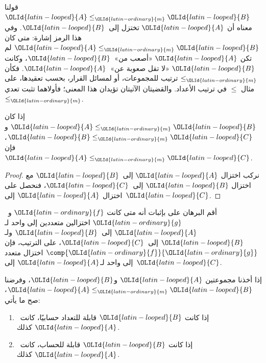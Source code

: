 \documentclass[../../../include/open-logic-section]{subfiles}
\begin{document}

قولنا ${\OLId{latin-looped}{A}}\leq_{\OLId{latin-ordinary}{m}} {\OLId{latin-looped}{B}}$ معناه أن ${\OLId{latin-looped}{A}}$ تختزل إلى~${\OLId{latin-looped}{B}}$. وفي هذا الرمز إشارة:
متى كان ${\OLId{latin-looped}{A}}\leq_{\OLId{latin-ordinary}{m}} {\OLId{latin-looped}{B}}$ لم تكن ${\OLId{latin-looped}{A}}$ «أصعب من»~${\OLId{latin-looped}{B}}$، وكانت ${\OLId{latin-looped}{B}}$ «لا تقل
صعوبة عن»~${\OLId{latin-looped}{A}}$. فكأن $\le_{\OLId{latin-ordinary}{m}}$ ترتيب للمجموعات، أو لمسائل القرار، بحسب
تعقيدها، على مثال $\le$ في ترتيب الأعداد. والقضيتان الآتيتان تؤيدان هذا
المعنى؛ فأولاهما تثبت تعدي $\le_{\OLId{latin-ordinary}{m}}$.

\begin{prop}
إذا كان ${\OLId{latin-looped}{A}}\leq_{\OLId{latin-ordinary}{m}} {\OLId{latin-looped}{B}}$ و${\OLId{latin-looped}{B}}\leq_{\OLId{latin-ordinary}{m}} {\OLId{latin-looped}{C}}$، فإن ${\OLId{latin-looped}{A}}\leq_{\OLId{latin-ordinary}{m}} {\OLId{latin-looped}{C}}$.
\end{prop}

\begin{proof}
نركب اختزال ${\OLId{latin-looped}{A}}$ إلى~${\OLId{latin-looped}{B}}$ مع اختزال ${\OLId{latin-looped}{B}}$ إلى~${\OLId{latin-looped}{C}}$، فنحصل على اختزال ${\OLId{latin-looped}{A}}$
إلى~${\OLId{latin-looped}{C}}$.
\end{proof}

\begin{prob}
أقم البرهان على  بإثبات أنه متى كانت ${\OLId{latin-ordinary}{f}}$ و~${\OLId{latin-ordinary}{g}}$ اختزالين
متعددين إلى واحد لـ${\OLId{latin-looped}{A}}$ إلى~${\OLId{latin-looped}{B}}$ ولـ${\OLId{latin-looped}{B}}$ إلى~${\OLId{latin-looped}{C}}$، على الترتيب، فإن
$\comp{{\OLId{latin-ordinary}{f}}}{{\OLId{latin-ordinary}{g}}}$ اختزال متعدد إلى واحد لـ${\OLId{latin-looped}{A}}$ إلى~${\OLId{latin-looped}{C}}$.
\end{prob}

\begin{prop}
إذا أخذنا مجموعتين ${\OLId{latin-looped}{A}}$ و${\OLId{latin-looped}{B}}$، وفرضنا ${\OLId{latin-looped}{A}}\leq_{\OLId{latin-ordinary}{m}} {\OLId{latin-looped}{B}}$، صح ما يأتي:
\begin{enumerate}
\item إذا كانت ${\OLId{latin-looped}{B}}$ قابلة للتعداد حسابيًا، كانت~${\OLId{latin-looped}{A}}$ كذلك.
\item إذا كانت ${\OLId{latin-looped}{B}}$ قابلة للحساب، كانت~${\OLId{latin-looped}{A}}$ كذلك.
\end{enumerate}
\end{prop}
\end{document}
